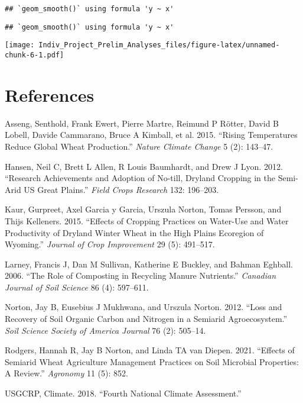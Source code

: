 \documentclass[
]{article}
\newlength{\cslhangindent}
\newlength{\cslentryspacingunit} %
\newenvironment{CSLReferences}[2] %
 {%
  \setlength{\parindent}{0pt}
  \ifodd #1
  \let\oldpar\par
  \def\par{\hangindent=\cslhangindent\oldpar}
  \fi
  \setlength{\parskip}{#2\cslentryspacingunit}
 }%
 {}
\begin{document}
\begin{verbatim}
## `geom_smooth()` using formula 'y ~ x'
\end{verbatim}

\begin{verbatim}
## `geom_smooth()` using formula 'y ~ x'
\end{verbatim}

\texttt{[image: Indiv\_Project\_Prelim\_Analyses\_files/figure-latex/unnamed-chunk-6-1.pdf]}

\hypertarget{references}{%
\section*{References}\label{references}}

\hypertarget{refs}{}
\begin{CSLReferences}{1}{0}
\leavevmode{}%
Asseng, Senthold, Frank Ewert, Pierre Martre, Reimund P Rötter, David B
Lobell, Davide Cammarano, Bruce A Kimball, et al. 2015. {``Rising
Temperatures Reduce Global Wheat Production.''} \emph{Nature Climate
Change} 5 (2): 143--47.

\leavevmode{}%
Hansen, Neil C, Brett L Allen, R Louis Baumhardt, and Drew J Lyon. 2012.
{``Research Achievements and Adoption of No-till, Dryland Cropping in
the Semi-Arid US Great Plains.''} \emph{Field Crops Research} 132:
196--203.

\leavevmode{}%
Kaur, Gurpreet, Axel Garcia y Garcia, Urszula Norton, Tomas Persson, and
Thijs Kelleners. 2015. {``Effects of Cropping Practices on Water-Use and
Water Productivity of Dryland Winter Wheat in the High Plains Ecoregion
of Wyoming.''} \emph{Journal of Crop Improvement} 29 (5): 491--517.

\leavevmode{}%
Larney, Francis J, Dan M Sullivan, Katherine E Buckley, and Bahman
Eghball. 2006. {``The Role of Composting in Recycling Manure
Nutrients.''} \emph{Canadian Journal of Soil Science} 86 (4): 597--611.

\leavevmode{}%
Norton, Jay B, Eusebius J Mukhwana, and Urszula Norton. 2012. {``Loss
and Recovery of Soil Organic Carbon and Nitrogen in a Semiarid
Agroecosystem.''} \emph{Soil Science Society of America Journal} 76 (2):
505--14.

\leavevmode{}%
Rodgers, Hannah R, Jay B Norton, and Linda TA van Diepen. 2021.
{``Effects of Semiarid Wheat Agriculture Management Practices on Soil
Microbial Properties: A Review.''} \emph{Agronomy} 11 (5): 852.

\leavevmode{}%
USGCRP, Climate. 2018. {``Fourth National Climate Assessment.''}

\end{CSLReferences}
\end{document}
